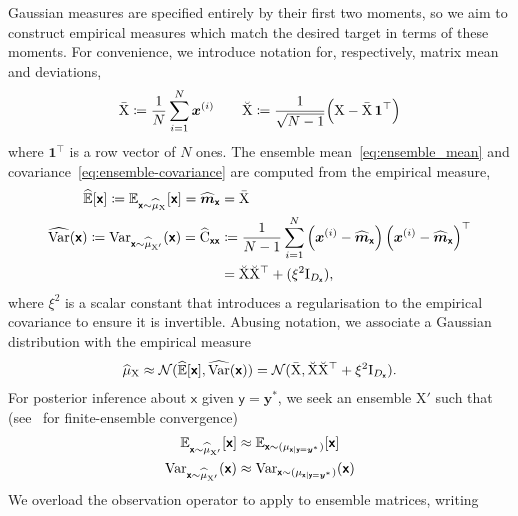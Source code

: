 \documentclass[wcp]{jmlr} %
\newcommand{\Ex}{\mathbb{E}}
\newcommand{\var}{\operatorname{Var}}
\newcommand{\vv}[1]{\boldsymbol{#1}}
\newcommand{\mm}[1]{\mathrm{#1}}
\newcommand{\mmmean}[1]{\bar{\mathrm{#1}}}
\newcommand{\mmdev}[1]{\breve{\mathrm{#1}}}
\newcommand{\rv}[1]{\mathsf{#1}}
\newcommand{\vrv}[1]{\vv{\rv{#1}}}
\newcommand{\Normal}{\mathcal{N}}
\newcommand{\gvn}{\mid}
\begin{document}
Gaussian measures are specified entirely by their first two moments, so we aim to construct empirical measures which match the desired target in terms of these moments.
For convenience, we introduce notation for, respectively, matrix mean and deviations,
\begin{align}
    \mmmean{X} \coloneq \frac{1}{N}\sum_{i=1}^N \vv{x}^{(i)}
    \quad\quad
    \mmdev{X} \coloneq \frac{1}{\sqrt{N-1}} \Bigl( \mm{X} - \mmmean{X}\,\vv{1}^\top \Bigr)
     \label{eq:deviation_matrix}
\end{align}
where \(\vv{1}^\top\) is a row vector of \(N\) ones.
The ensemble mean~\eqref{eq:ensemble_mean} and covariance~\eqref{eq:ensemble-covariance} are computed from the empirical measure,
\begin{align}
    \widehat{\Ex}[\vrv{x}]\coloneq \Ex_{\vrv{x}\sim \ELaw[\mm{X}]}[ \vrv{x}] =\widehat{\vv{m}}_{\vrv{x}}
&=\mmmean{X}\label{eq:ensemble_mean} \\
\widehat{\var}(\vrv{x}) \coloneq\var_{\vrv{x}\sim \ELaw[\mm{X}']} (\vrv{x})=\widehat{\mm{C}}_{\vrv{xx}} &\coloneq \frac{1}{N-1} \sum_{i=1}^{N} \left(\vv{x}^{(i)} - \widehat{\vv{m}}_{\vrv{x}}\right)\left(\vv{x}^{(i)} - \widehat{\vv{m}}_{\vrv{x}}\right)^\top  \\
&=\mmdev{X} \mmdev{X}^\top + (\xi^2\mm{I}_{D_{\vrv{x}}}),\label{eq:ensemble-covariance}
\end{align}
where \(\xi^2\) is a scalar constant that introduces a regularisation to the empirical covariance to ensure it is invertible.
Abusing notation, we associate a Gaussian distribution with the empirical measure
\begin{align}
\ELaw[\mm{X}] \approx \Normal(\widehat{\Ex}[\vrv{x}], \widehat{\var}(\vrv{x})) = \Normal(\mmmean{X}, \mmdev{X} \mmdev{X}^\top + \xi^2\mm{I}_{D_{\vrv{x}}}).
\end{align}
For posterior inference about $\vrv{x}$ given $\vrv{y}=\vv{y}^*$, we seek an ensemble $\mm{X}'$ such that (see~\cite{LeGland2009Large,Mandel2011Convergence,Kelly2014Wellposedness,Kwiatkowski2015Convergence,DelMoral2017Stability} for finite-ensemble convergence)
\begin{align}
    \Ex_{\vrv{x}\sim \ELaw[\mm{X}']}[ \vrv{x}] &\approx \Ex_{\vrv{x}\sim (\Law[\vrv{x} \gvn \vrv{y}=\vv{y}^*])} [\vrv{x}]\\
    \var_{\vrv{x}\sim \ELaw[\mm{X}']} (\vrv{x}) &\approx \var_{\vrv{x}\sim (\Law[\vrv{x} \gvn \vrv{y}=\vv{y}^*])} (\vrv{x})
\end{align}
We overload the observation operator to apply to ensemble matrices, writing
\end{document}
